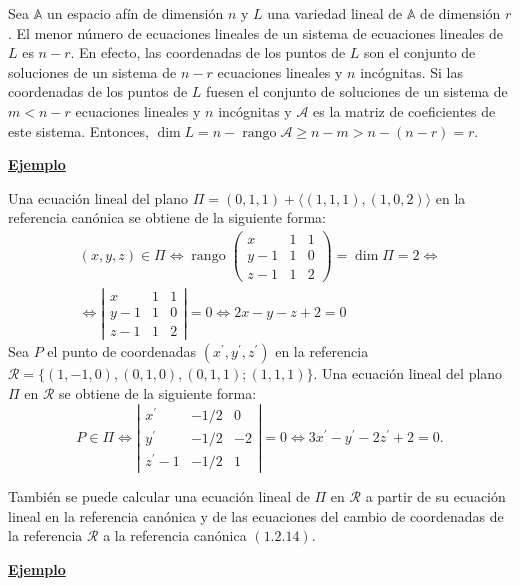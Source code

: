 \documentclass[12pt, a4paper, ones, notitlepage, openany,titlepage]{article}
\newcommand{\ejemplo}{\noindent\underline{\textbf{Ejemplo}}}
\begin{document}
Sea $\mathbb{A}$ un espacio afín de dimensión $n$ y $L$ una variedad lineal de $\mathbb{A}$ de dimensión $r$. El menor número de ecuaciones lineales de un sistema de ecuaciones lineales de $L$ es $n-r$. En efecto, las coordenadas de los puntos de $L$ son el conjunto de soluciones de un sistema de $n-r$ ecuaciones lineales y $n$ incógnitas. Si las coordenadas de los puntos de $L$ fuesen el conjunto de soluciones de un sistema de $m<n-r$ ecuaciones lineales y $n$ incógnitas y $\mathcal{A}$ es la matriz de coeficientes de este sistema. Entonces, $\dim  L=n-\operatorname{rango} \mathcal{A} \geq n-m>n-(n-r)=r$.

\ejemplo

Una ecuación lineal del plano $\Pi=(0,1,1)+\langle(1,1,1),(1,0,2)\rangle$ en la referencia canónica se obtiene de la siguiente forma:
\begin{gather*}
(x, y, z) \in \Pi \Longleftrightarrow \operatorname{rango}\left(\begin{array}{ccc}x & 1 & 1 \\ y-1 & 1 & 0 \\ z-1 & 1 & 2\end{array}\right)=\dim  \Pi=2 \Longleftrightarrow \\ \Longleftrightarrow \left|\begin{array}{ccc}x & 1 & 1 \\ y-1 & 1 & 0 \\ z-1 & 1 & 2\end{array}\right|=0 \Longleftrightarrow 2 x-y-z+2=0
\end{gather*}
Sea $P$ el punto de coordenadas $\left(x^{\prime}, y^{\prime}, z^{\prime}\right)$ en la referencia $\mathcal{R}=\{(1,-1,0),(0,1,0),(0,1,1) ;(1,1,1)\}$. Una ecuación lineal del plano $\Pi$ en $\mathcal{R}$ se obtiene de la siguiente forma:
$$
P \in \Pi \Longleftrightarrow\left|\begin{array}{ccr}
x^{\prime} & -1 / 2 & 0 \\
y^{\prime} & -1 / 2 & -2 \\
z^{\prime}-1 & -1 / 2 & 1
\end{array}\right|=0 \Longleftrightarrow 3 x^{\prime}-y^{\prime}-2 z^{\prime}+2=0 .
$$

También se puede calcular una ecuación lineal de $\Pi$ en $\mathcal{R}$ a partir de su ecuación lineal en la referencia canónica y de las ecuaciones del cambio de coordenadas de la referencia $\mathcal{R}$ a la referencia canónica $(1.2 .14)$.

\ejemplo
\end{document}
